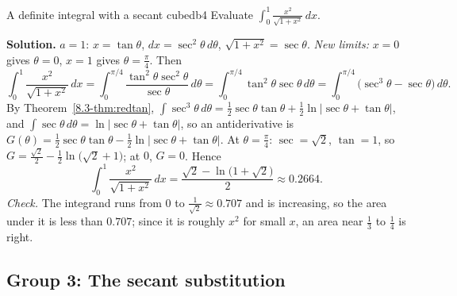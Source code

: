 \documentclass[11pt]{article}
\begin{document}
\begin{exmp}{A definite integral with a secant cubed}{b4}
Evaluate $\int_0^1\frac{x^2}{\sqrt{1+x^2}}\,dx$.

\textbf{Solution.} $a=1$: $x=\tan\theta$, $dx=\sec^2\theta\,d\theta$, $\sqrt{1+x^2}=\sec\theta$. \emph{New limits:} $x=0$ gives $\theta=0$, $x=1$ gives $\theta=\frac\pi4$. Then
\[\int_0^1\frac{x^2}{\sqrt{1+x^2}}\,dx=\int_0^{\pi/4}\frac{\tan^2\theta\sec^2\theta}{\sec\theta}\,d\theta=\int_0^{\pi/4}\tan^2\theta\sec\theta\,d\theta=\int_0^{\pi/4}\big(\sec^3\theta-\sec\theta\big)\,d\theta .\]
By Theorem~\ref{8.3-thm:redtan}, $\int\sec^3\theta\,d\theta=\frac12\sec\theta\tan\theta+\frac12\ln\lvert\sec\theta+\tan\theta\rvert$, and $\int\sec\theta\,d\theta=\ln\lvert\sec\theta+\tan\theta\rvert$, so an antiderivative is $G(\theta)=\frac12\sec\theta\tan\theta-\frac12\ln\lvert\sec\theta+\tan\theta\rvert$. At $\theta=\frac\pi4$: $\sec=\sqrt2$, $\tan=1$, so $G=\frac{\sqrt2}2-\frac12\ln\big(\sqrt2+1\big)$; at $0$, $G=0$. Hence
\[\int_0^1\frac{x^2}{\sqrt{1+x^2}}\,dx=\frac{\sqrt2-\ln\big(1+\sqrt2\big)}2\approx0.2664 .\]
\emph{Check.} The integrand runs from $0$ to $\frac1{\sqrt2}\approx0.707$ and is increasing, so the area under it is less than $0.707$; since it is roughly $x^2$ for small $x$, an area near $\frac13$ to $\frac14$ is right.
\end{exmp}

\subsection*{Group 3: The secant substitution}
\end{document}
